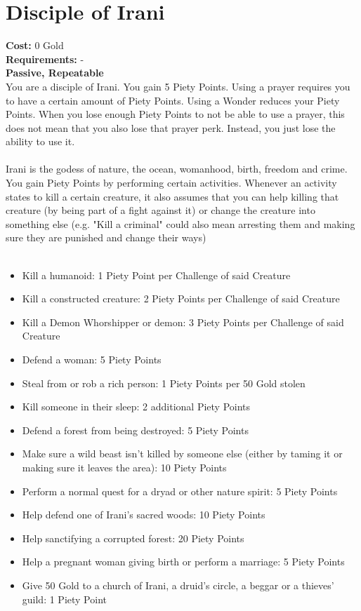 \section{Disciple of Irani}
\textbf{Cost:} 0 Gold\\
\textbf{Requirements:} - \\
\textbf{Passive, Repeatable}\\
You are a disciple of Irani. You gain 5 Piety Points. Using a prayer requires you to have a certain amount of Piety Points. Using a Wonder reduces your Piety Points. When you lose enough Piety Points to not be able to use a prayer, this does not mean that you also lose that prayer perk. Instead, you just lose the ability to use it.\\
\\
Irani is the godess of nature, the ocean, womanhood, birth, freedom and crime. You gain Piety Points by performing certain activities. Whenever an activity states to kill a certain creature, it also assumes that you can help killing that creature (by being part of a fight against it) or change the creature into something else (e.g. "Kill a criminal" could also mean arresting them and making sure they are punished and change their ways)\\
\\
\begin{itemize}
	\item Kill a humanoid: 1 Piety Point per Challenge of said Creature
	\item Kill a constructed creature: 2 Piety Points per Challenge of said Creature
	\item Kill a Demon Whorshipper or demon: 3 Piety Points per Challenge of said Creature
	\item Defend a woman: 5 Piety Points
	\item Steal from or rob a rich person: 1 Piety Points per 50 Gold stolen
	\item Kill someone in their sleep: 2 additional Piety Points
	\item Defend a forest from being destroyed: 5 Piety Points
	\item Make sure a wild beast isn't killed by someone else (either by taming it or making sure it leaves the area): 10 Piety Points
	\item Perform a normal quest for a dryad or other nature spirit: 5 Piety Points
	\item Help defend one of Irani's sacred woods: 10 Piety Points
	\item Help sanctifying a corrupted forest: 20 Piety Points
	\item Help a pregnant woman giving birth or perform a marriage: 5 Piety Points
	\item Give 50 Gold to a church of Irani, a druid's circle, a beggar or a thieves' guild: 1 Piety Point
\end{itemize}

